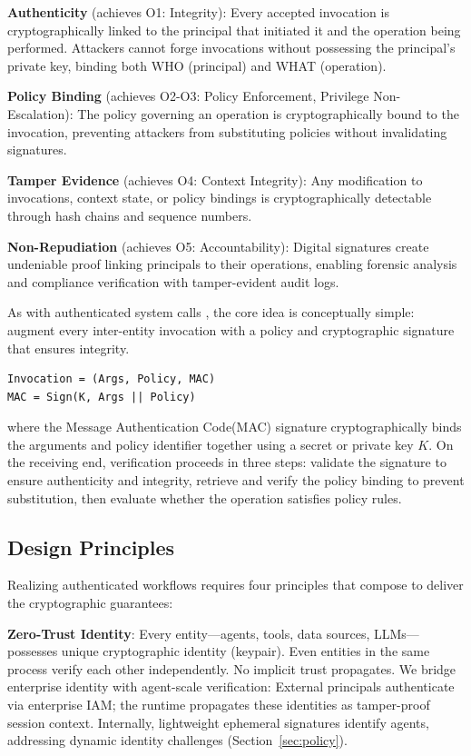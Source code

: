 \textbf{Authenticity} (achieves O1: Integrity): Every accepted invocation is cryptographically linked to the principal that initiated it and the operation being performed. Attackers cannot forge invocations without possessing the principal's private key, binding both WHO (principal) and WHAT (operation).

\textbf{Policy Binding} (achieves O2-O3: Policy Enforcement, Privilege Non-Escalation): The policy governing an operation is cryptographically bound to the invocation, preventing attackers from substituting policies without invalidating signatures.

\textbf{Tamper Evidence} (achieves O4: Context Integrity): Any modification to invocations, context state, or policy bindings is cryptographically detectable through hash chains and sequence numbers.

\textbf{Non-Repudiation} (achieves O5: Accountability): Digital signatures create undeniable proof linking principals to their operations, enabling forensic analysis and compliance verification with tamper-evident audit logs.

As with authenticated system calls \cite{rajagopalan2006,erlingsson2004}, the core idea is conceptually simple: augment every inter-entity invocation with a policy and cryptographic signature that ensures integrity.
{\small
\begin{verbatim}
Invocation = (Args, Policy, MAC)
MAC = Sign(K, Args || Policy)
\end{verbatim}
}
where the Message Authentication Code(MAC) signature cryptographically binds the arguments and policy identifier together using a secret or private key $K$. On the receiving end, verification proceeds in three steps: validate the signature to ensure authenticity and integrity, retrieve and verify the policy binding to prevent substitution, then evaluate whether the operation satisfies policy rules.

\subsection{Design Principles}

Realizing authenticated workflows requires four principles that compose to deliver the cryptographic guarantees:

\textbf{Zero-Trust Identity}: Every entity—agents, tools, data sources, LLMs—possesses unique cryptographic identity (keypair). Even entities in the same process verify each other independently. No implicit trust propagates. We bridge enterprise identity with agent-scale verification: External principals authenticate via enterprise IAM; the runtime propagates these identities as tamper-proof session context. Internally, lightweight ephemeral signatures identify agents, addressing dynamic identity challenges (Section~\ref{sec:policy}).

